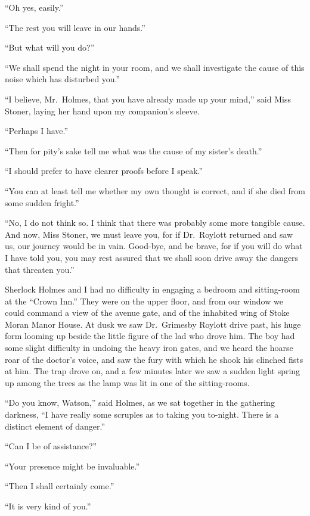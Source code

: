 “Oh yes, easily.”

“The rest you will leave in our hands.”

“But what will you do?”

“We shall spend the night in your room, and we shall investigate
the cause of this noise which has disturbed you.”

“I believe, Mr.~Holmes, that you have already made up
your mind,” said Miss Stoner, laying her hand upon my companion’s
sleeve.

“Perhaps I have.”

“Then for pity’s sake tell me what was the cause of my
sister’s death.”

“I should prefer to have clearer proofs before I speak.”

“You can at least tell me whether my own thought is correct,
and if she died from some sudden fright.”

“No, I do not think so. I think that there was probably
some more tangible cause. And now, Miss Stoner, we must
leave you, for if Dr.\ Roylott returned and saw us, our journey
would be in vain. Good-bye, and be brave, for if you will do
what I have told you, you may rest assured that we shall soon
drive away the dangers that threaten you.”

Sherlock Holmes and I had no difficulty in engaging a bedroom
and sitting-room at the “Crown Inn.” They were on
the upper floor, and from our window we could command a
view of the avenue gate, and of the inhabited wing of Stoke
Moran Manor House. At dusk we saw Dr.\ Grimesby Roylott
drive past, his huge form looming up beside the little figure
of the lad who drove him. The boy had some slight
difficulty in undoing the heavy iron gates, and we heard the
hoarse roar of the doctor’s voice, and saw the fury with which
he shook his clinched fists at him. The trap drove on, and a
few minutes later we saw a sudden light spring up among the
trees as the lamp was lit in one of the sitting-rooms.

“Do you know, Watson,” said Holmes, as we sat together
in the gathering darkness, “I have really some scruples as to
taking you to-night. There is a distinct element of danger.”

“Can I be of assistance?”

“Your presence might be invaluable.”

“Then I shall certainly come.”

“It is very kind of you.”

